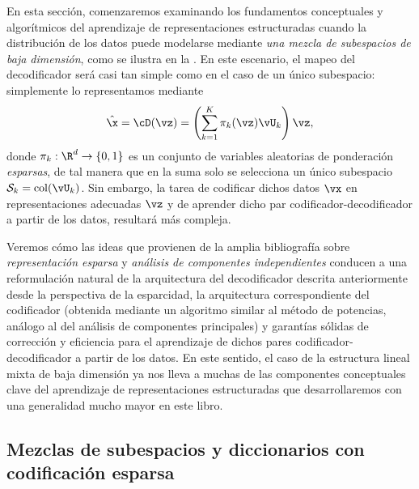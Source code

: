 \documentclass[../../book-main.tex]{subfiles}
\begin{document}

En esta sección, comenzaremos examinando los fundamentos conceptuales y algorítmicos
del aprendizaje de representaciones estructuradas cuando la distribución de los datos
puede modelarse mediante {\em una mezcla de subespacios de baja dimensión}, como
se ilustra en la . En este escenario, el mapeo del decodificador
será casi tan simple como en el caso de un único subespacio:
simplemente lo representamos mediante
\begin{equation}\label{eq:mixture-subspaces-decoder-first-cut}
    \hat{\x} = \cD(\vz) = \left( \sum_{k=1}^K \pi_k(\vz)\vU_k \right) \vz,
\end{equation}
donde $\pi_k : \R^d \to \{0,1\}$ es un conjunto de variables aleatorias de ponderación \textit{esparsas},
de tal manera que en la suma solo se selecciona un único subespacio $\mathcal{S}_k
= \mathop{\mathrm{col}}(\vU_k)$. Sin embargo, la tarea de codificar dichos datos $\vx$ en representaciones adecuadas
$\vz$ y de aprender dicho par codificador-decodificador a partir de los datos, resultará más compleja.

Veremos cómo las ideas que provienen de la amplia bibliografía sobre \textit{representación esparsa}
y \textit{análisis de componentes independientes} conducen a una reformulación natural de
la arquitectura del decodificador descrita anteriormente desde la perspectiva de la esparcidad, la arquitectura
correspondiente del codificador (obtenida mediante un algoritmo similar al método de potencias, análogo
al del análisis de componentes principales) y garantías sólidas de corrección
y eficiencia para el aprendizaje de dichos pares codificador-decodificador a partir de los datos.
En este sentido, el caso de la estructura lineal mixta de baja dimensión ya nos lleva a muchas de las
componentes conceptuales clave del aprendizaje de representaciones estructuradas que
desarrollaremos con una generalidad mucho mayor en este libro.

\subsection{Mezclas de subespacios y diccionarios
con codificación esparsa}
\label{sec:mixture-and-dict}
\end{document}
